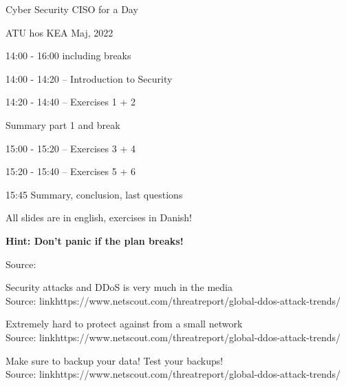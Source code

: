 \documentclass[Screen16to9,17pt]{foils}
\begin{document}
{Cyber Security CISO for a Day}

ATU hos KEA Maj, 2022


\begin{list1}
\item 14:00 - 16:00 including breaks
\vskip 1cm
\item 14:00 - 14:20 -- Introduction to Security
\item 14:20 - 14:40 -- Exercises 1 + 2
\item Summary part 1 and break
\item 15:00 - 15:20 -- Exercises 3 + 4
\item 15:20 - 15:40 -- Exercises 5 + 6
\item 15:45 Summary, conclusion, last questions
\end{list1}

All slides are in english, exercises in Danish!

{\bf Hint: Don't panic if the plan breaks!}


Source: 




Security attacks and DDoS is very much in the media\\
Source: link{https://www.netscout.com/threatreport/global-ddos-attack-trends/}




Extremely hard to protect against from a small network\\
Source: link{https://www.netscout.com/threatreport/global-ddos-attack-trends/}





Make sure to backup your data! Test your backups!\\
Source: link{https://www.netscout.com/threatreport/global-ddos-attack-trends/}


\end{document}

